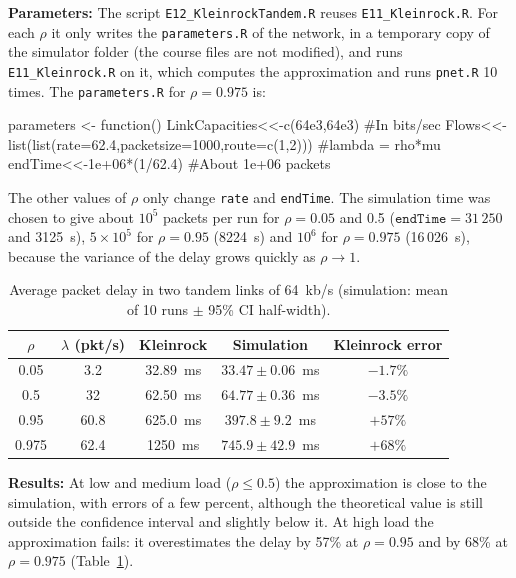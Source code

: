 ﻿\documentclass[12pt]{article}
\begin{document}
\textbf{Parameters:} The script \texttt{E12\_KleinrockTandem.R} reuses
\texttt{E11\_Kleinrock.R}. For each $\rho$ it only writes the
\texttt{parameters.R} of the network, in a temporary copy of the simulator
folder (the course files are not modified), and runs
\texttt{E11\_Kleinrock.R} on it, which computes the approximation and runs
\texttt{pnet.R} 10 times. The \texttt{parameters.R} for $\rho=0.975$ is:
\begin{configbox}
parameters <- function() {
  LinkCapacities<<-c(64e3,64e3) #In bits/sec
  Flows<<-list(list(rate=62.4,packetsize=1000,route=c(1,2))) #lambda = rho*mu
  endTime<<-1e+06*(1/62.4) #About 1e+06 packets
}
\end{configbox}
The other values of $\rho$ only change \texttt{rate} and \texttt{endTime}. The
simulation time was chosen to give about $10^5$ packets per run for
$\rho=0.05$ and 0.5 ($\texttt{endTime}=31\,250$ and 3125~s), $5\times10^5$ for
$\rho=0.95$ (8224~s) and $10^6$ for $\rho=0.975$ (16\,026~s), because the
variance of the delay grows quickly as $\rho\to1$.

\begin{table}[H]
    \centering
    \caption{Average packet delay in two tandem links of 64~kb/s (simulation: mean of 10 runs $\pm$ 95\% CI half-width).}
    \label{tab:tandem}
    \begin{tabular}{c|c|c|c|c}
        $\rho$ & $\lambda$ (pkt/s) & Kleinrock & Simulation & Kleinrock error \\
        \hline
        0.05  & 3.2  & 32.89~ms  & $33.47\pm0.06$~ms & $-1.7\%$ \\
        0.5   & 32   & 62.50~ms  & $64.77\pm0.36$~ms & $-3.5\%$ \\
        0.95  & 60.8 & 625.0~ms  & $397.8\pm9.2$~ms  & $+57\%$ \\
        0.975 & 62.4 & 1250~ms   & $745.9\pm42.9$~ms & $+68\%$ \\
    \end{tabular}
\end{table}

\textbf{Results:} At low and medium load ($\rho\le0.5$) the approximation is
close to the simulation, with errors of a few percent, although the theoretical
value is still outside the confidence interval and slightly below it. At high
load the approximation fails: it overestimates the delay by 57\% at
$\rho=0.95$ and by 68\% at $\rho=0.975$ (Table~\ref{tab:tandem}).
\end{document}
